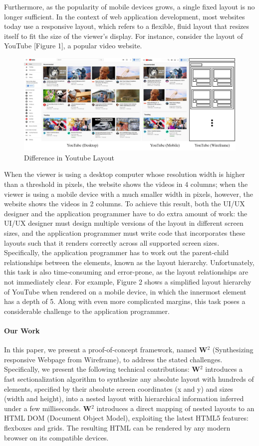 \documentclass[runningheads]{llncs}
\newcommand{\W}{\textbf{W}$^2$ }
\begin{document}
Furthermore, as the popularity of mobile devices grows, a single fixed layout is no longer sufficient. In the context of web application development, most websites today use a responsive layout, which refers to a flexible, fluid layout that resizes itself to fit the size of the viewer's display. For instance, consider the layout of YouTube [Figure 1], a popular video website.
\begin{figure}[H]
  \vspace*{-0.1in}
  \includegraphics[width=1\textwidth]{src/youtube.jpg}
  \caption{Difference in Youtube Layout}
\end{figure}
When the viewer is using a desktop computer whose resolution width is higher than a threshold in pixels, the website shows the videos in 4 columns; when the viewer is using a mobile device with a much smaller width in pixels, however, the website shows the videos in 2 columns. To achieve this result, both the UI/UX designer and the application programmer have to do extra amount of work: the UI/UX designer must design multiple versions of the layout in different screen sizes, and the application programmer must write code that incorporates these layouts such that it renders correctly across all supported screen sizes. Specifically, the application programmer has to work out the parent-child relationships between the elements, known as the layout hierarchy. Unfortunately, this task is also time-consuming and error-prone, as the layout relationships are not immediately clear. For example, Figure 2 shows a simplified layout hierarchy of YouTube when rendered on a mobile device, in which the innermost element has a depth of 5. Along with even more complicated margins, this task poses a considerable challenge to the application programmer.
\paragraph{Our Work} In this paper, we present a proof-of-concept framework, named \W (Synthesizing responsive Webpage from Wireframe), to address the stated challenges. Specifically, we present the following technical contributions:
\W introduces a fast sectionalization algorithm to synthesize any absolute layout with hundreds of elements, specified by their absolute screen coordinates (x and y) and sizes (width and height), into a nested layout with hierarchical information inferred under a few milliseconds.
\W introduces a direct mapping of nested layouts to an HTML DOM (Document Object Model), exploiting the latest HTML5 features: flexboxes and grids. The resulting HTML can be rendered by any modern browser on its compatible devices.
\end{document}
